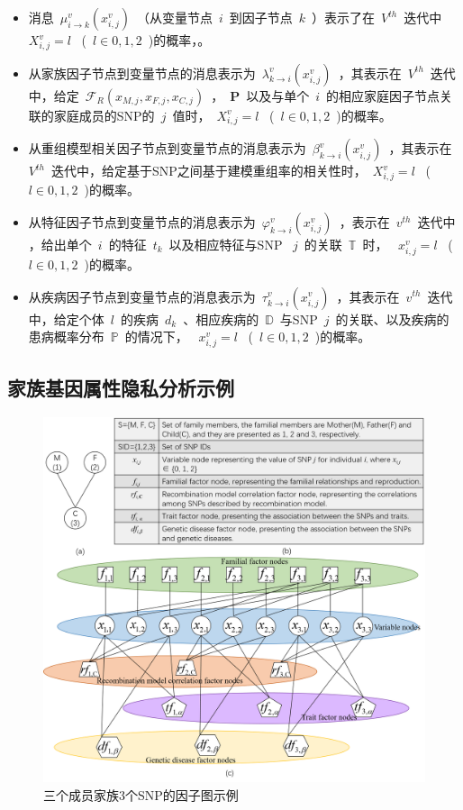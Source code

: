 \begin{itemize}
	\item 消息~$\mu_{i\rightarrow k}^{v}(x_{i,j}^{v})$~（从变量节点~$i$~到因子节点~$k$~）表示了在~$V^{th}$~迭代中 ~$X_{i,j}^v=l$~ (~$l \in {0,1,2}$~)的概率，。
	\item 从家族因子节点到变量节点的消息表示为~$\lambda_{k \rightarrow i}^v(x_{i,j}^v)$~，其表示在~$V^{th}$~迭代中，给定~$\mathcal{F}_{R}(x_{M,j},x_{F,j}, x_{C,j})$~，~$\mathbf{P}$~以及与单个~$i$~的相应家庭因子节点关联的家庭成员的SNP的~$j$~值时，~$X_{i,j}^v=l$~ (~$l \in {0,1,2}$~)的概率。
	\item 从重组模型相关因子节点到变量节点的消息表示为~$\beta_{k \rightarrow i}^v(x_{i,j}^v)$~，其表示在~$V^{th}$~迭代中，给定基于SNP之间基于建模重组率的相关性时，~$X_{i,j}^v=l$~ (~$l \in {0,1,2}$~)的概率。
	\item 从特征因子节点到变量节点的消息表示为~$\varphi_{k \rightarrow i}^v(x_{i,j}^v)$~，表示在~$v^{th}$~迭代中 ，给出单个~$i$~的特征~$t_k$~以及相应特征与SNP ~$j$~的关联~$\mathbb{T}$~时， ~$x_{i,j}^v=l$~ (~$l \in {0,1,2}$~)的概率。
	\item 从疾病因子节点到变量节点的消息表示为~$\tau_{k \rightarrow i}^v(x_{i,j}^v)$~，其表示在~$v^{th}$~迭代中，给定个体~$l$~的疾病~$d_k$~、相应疾病的~$\mathbb{D}$~与SNP~$j$~的关联、以及疾病的患病概率分布~$\mathbb{P}$~的情况下， ~$x_{i,j}^v=l$~ (~$l \in {0,1,2}$~)的概率。
	
\end{itemize}

\subsection{家族基因属性隐私分析示例}

\begin{figure}[htbp]
	\centering
	\includegraphics[width=0.95\linewidth]{./figures/factor-graph.png}
	\centering
	\caption{三个成员家族3个SNP的因子图示例}\label{fig:factor-graph}
\end{figure}

